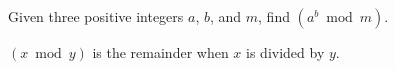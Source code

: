 Given three positive integers $a$, $b$, and $m$, find $(a^b \bmod m)$.

$(x \bmod y)$ is the remainder when $x$ is divided by $y$.